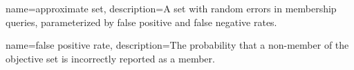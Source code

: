 {
    name={approximate set},
    description={A set with random errors in membership queries, parameterized by false positive and false negative rates.}
}

{
    name={false positive rate},
    description={The probability that a non-member of the objective set is incorrectly reported as a member.}
}
